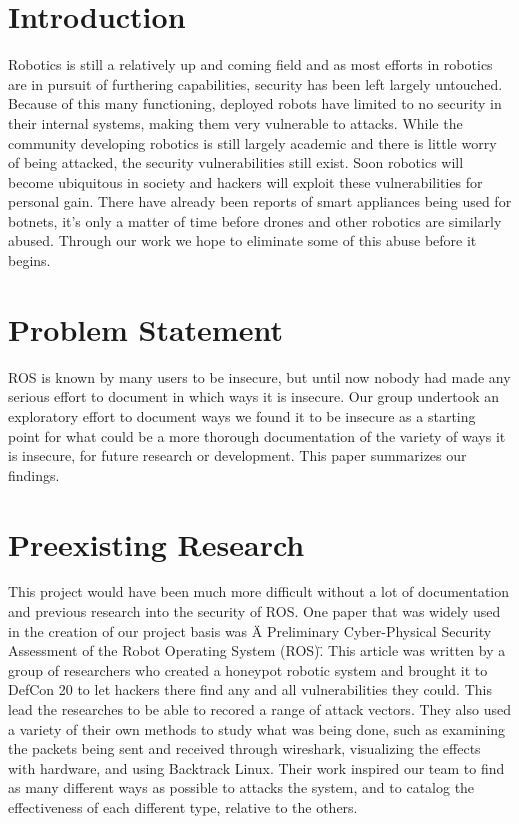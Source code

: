 \documentclass[IEEEtran,letterpaper,10pt,notitlepage,draftclsnofoot,onecolumn]{article}
\begin{document}
\newpage
{}
\tableofcontents
\clearpage

\section{Introduction}
Robotics is still a relatively up and coming field and as most efforts in robotics are in pursuit of furthering capabilities, security has been left largely untouched.
Because of this many functioning, deployed robots have limited to no security in their internal systems, making them very vulnerable to attacks.
While the community developing robotics is still largely academic and there is little worry of being attacked, the security vulnerabilities still exist.
Soon robotics will become ubiquitous in society and hackers will exploit these vulnerabilities for personal gain.
There have already been reports of smart appliances being used for botnets, it's only a matter of time before drones and other robotics are similarly abused. \cite{ddos}
Through our work we hope to eliminate some of this abuse before it begins.

\section{Problem Statement}
ROS is known by many users to be insecure, but until now nobody had made any serious effort to document in which ways it is insecure.
Our group undertook an exploratory effort to document ways we found it to be insecure as a starting point for what could be a more thorough documentation of the variety of ways it is insecure, for future research or development.
This paper summarizes our findings.

\section{Preexisting Research}
This project would have been much more difficult without a lot of documentation and previous research into the security of ROS.
One paper that was widely used in the creation of our project basis was \"A Preliminary Cyber-Physical Security Assessment of the Robot
Operating System (ROS)\". \cite{mainROS}
This article was written by a group of researchers who created a honeypot robotic system and brought it to DefCon 20 to let hackers there find any and all vulnerabilities they could.
This lead the researches to be able to recored a range of attack vectors.
They also used a variety of their own methods to study what was being done, such as examining the packets being sent and received through wireshark, visualizing the effects with hardware, and using Backtrack Linux.
Their work inspired our team to find as many different ways as possible to attacks the system, and to catalog the effectiveness of each different type, relative to the others.
\end{document}
